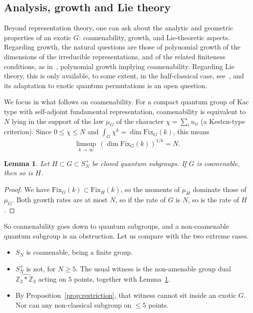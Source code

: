 \documentclass[11pt]{amsart}
\newtheorem{lemma}[theorem]{Lemma}
\theoremstyle{definition}
\theoremstyle{remark}
\theoremstyle{plain}
\numberwithin{equation}{section}
\numberwithin{table}{section}
\newcommand{\Z}{\mathbb Z}
\newcommand{\Fix}{\mathrm{Fix}}
\begin{document}
\subsection{Analysis, growth and Lie theory}

Beyond representation theory, one can ask about the analytic and geometric properties of an exotic $G$: coamenability, growth, and Lie-theoretic aspects. Regarding growth, the natural questions are those of polynomial growth of the dimensions of the irreducible representations, and of the related finiteness conditions, as in~\cite{cdpr,dpr}, polynomial growth implying coamenability. Regarding Lie theory, this is only available, to some extent, in the half-classical case, see~\cite{bv,bdv}, and its adaptation to exotic quantum permutations is an open question.

We focus in what follows on coamenability. For a compact quantum group of Kac type with self-adjoint fundamental representation, coamenability is equivalent to $N$ lying in the support of the law $\mu_G$ of the character $\chi=\sum_iu_{ii}$ (a Kesten-type criterion). Since $0\le\chi\le N$ and $\int_G\chi^k=\dim\Fix_G(k)$, this means
\[
\limsup_{k\to\infty}\,(\dim\Fix_G(k))^{1/k}=N.
\]

\begin{lemma}\label{lem:coamsub}
Let $H\subset G\subset S_N^+$ be closed quantum subgroups. If $G$ is coamenable, then so is $H$.
\end{lemma}

\begin{proof}
We have $\Fix_G(k)\subset\Fix_H(k)$, so the moments of $\mu_H$ dominate those of $\mu_G$. Both growth rates are at most $N$, so if the rate of $G$ is $N$, so is the rate of $H$.
\end{proof}

So coamenability goes down to quantum subgroups, and a non-coamenable quantum subgroup is an obstruction. Let us compare with the two extreme cases.
\begin{itemize}
\item $S_N$ is coamenable, being a finite group.
\item $S_N^+$ is not, for $N\ge5$. The usual witness is the non-amenable group dual $\widehat{\Z_2*\Z_3}$ acting on $5$ points, together with Lemma~\ref{lem:coamsub}.
\item By Proposition~\ref{prop:restriction}, that witness cannot sit inside an exotic $G$. Nor can any non-classical subgroup on $\le5$ points.
\end{itemize}
\end{document}
